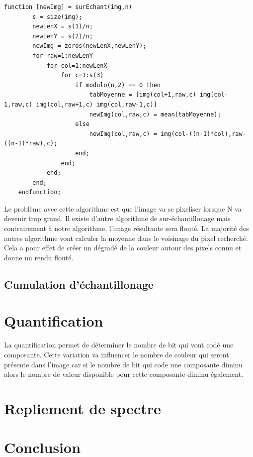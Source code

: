 \documentclass[a4paper,11pt]{article}
\begin{document}
  \begin{lstlisting}[caption=Fonction permettant le sur-échantillonnement d'une image]
    function [newImg] = surEchant(img,n)
        s = size(img);
        newLenX = s(1)/n;
        newLenY = s(2)/n;
        newImg = zeros(newLenX,newLenY);
        for raw=1:newLenY
            for col=1:newLenX
                for c=1:s(3)
                    if modulo(n,2) == 0 then
                        tabMoyenne = [img(col+1,raw,c) img(col-1,raw,c) img(col,raw+1,c) img(col,raw-1,c)]
                        newImg(col,raw,c) = mean(tabMoyenne);    
                    else
                        newImg(col,raw,c) = img(col-((n-1)*col),raw-((n-1)*raw),c);
                    end;
                end;
            end;
        end;
    endfunction;
  \end{lstlisting}
  
  Le problème avec cette algorithme est que l'image va se pixeliser lorsque N va devenir trop grand. Il existe 
  d'autre algorithme de sur-échantillonage mais contrairement à notre algorithme, l'image résultante sera flouté.
  La majorité des autres algorithme vont calculer la moyenne dans le voisinage du pixel recherché. Cela a pour 
  effet de créer un dégradé de la couleur autour des pixels connu et donne un rendu flouté.
  
  \subsection{Cumulation d'échantillonage}
  
  \section{Quantification}
  La quantification permet de déterminer le nombre de bit qui vont codé une composante. Cette variation
  va influencer le nombre de couleur qui seront présente dans l'image car si le nombre de bit qui code
  une composante diminu alors le nombre de valeur disponible pour cette composante diminu également.
  
  \section{Repliement de spectre}
  
  \section*{Conclusion}
 
    
\end{document}
